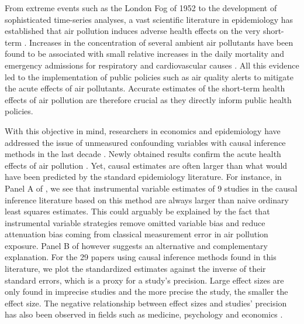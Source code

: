 \documentclass[12pt]{article}
\begin{document}
    From extreme events such as the London Fog of 1952 to the development of sophisticated time-series analyses, a vast scientific literature in epidemiology has established that air pollution induces adverse health effects on the very short-term \citep{schwartz1994people, le2002short, bell2004time, di_association_2017, liu_ambient_2019}. Increases in the concentration of several ambient air pollutants have been found to be associated with small relative increases in the daily mortality and emergency admissions for respiratory and cardiovascular causes \citep{samet2000national, shah2015short, orellano2020short}. All this evidence led to the implementation of public policies such as air quality alerts to mitigate the acute effects of air pollutants. Accurate estimates of the short-term health effects of air pollution are therefore crucial as they directly inform public health policies.
    
    With this objective in mind, researchers in economics and epidemiology have addressed the issue of unmeasured confounding variables with causal inference methods in the last decade \citep{dominici_best_2017, bind_causal_2019}. Newly obtained results confirm the acute health effects of air pollution \citep{schwartz_estimating_2015, schwartz_national_2018, deryugina_mortality_2019}. Yet, causal estimates are often larger than what would have been predicted by the standard epidemiology literature. For instance, in Panel A of , we see that instrumental variable estimates of 9 studies in the causal inference literature based on this method are always larger than naive ordinary least squares estimates. This could arguably be explained by the fact that instrumental variable strategies remove omitted variable bias and reduce attenuation bias coming from classical measurement error in air pollution exposure. Panel B of  however suggests an alternative and complementary explanation. For the 29 papers using causal inference methods found in this literature, we plot the standardized estimates against the inverse of their standard errors, which is a proxy for a study's precision. Large effect sizes are only found in imprecise studies and the more precise the study, the smaller the effect size. The negative relationship between effect sizes and studies' precision has also been observed in fields such as medicine, psychology and economics \citep{button2013power, camerer2018evaluating, schafer2019meaningfulness}.
    
\end{document}
